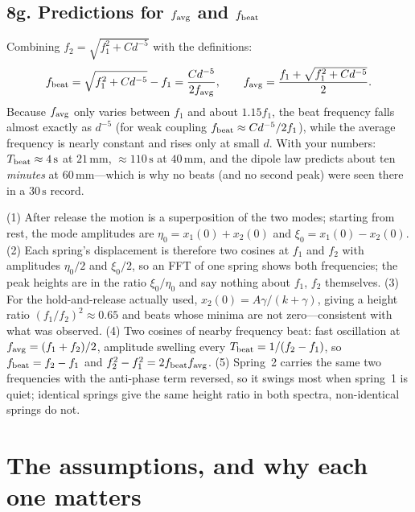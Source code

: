 \documentclass[11pt,a4paper]{article}
\newcommand{\un}[1]{\,\mathrm{#1}}
\begin{document}
\subsection*{8g. Predictions for $f_{\rm avg}$ and $f_{\rm beat}$}
Combining $f_2=\sqrt{f_1^2+Cd^{-5}}$ with the definitions:
\begin{equation}
f_{\rm beat}=\sqrt{f_1^2+Cd^{-5}}-f_1=\frac{Cd^{-5}}{2f_{\rm avg}},\qquad
f_{\rm avg}=\frac{f_1+\sqrt{f_1^2+Cd^{-5}}}{2}.
\end{equation}
Because $f_{\rm avg}$ only varies between $f_1$ and about $1.15f_1$, the beat frequency falls almost exactly as $d^{-5}$ (for weak coupling $f_{\rm beat}\approx Cd^{-5}/2f_1$), while the average frequency is nearly constant and rises only at small $d$. With your numbers: $T_{\rm beat}\approx4\un{s}$ at $21\un{mm}$, $\approx110\un{s}$ at $40\un{mm}$, and the dipole law predicts about ten \emph{minutes} at $60\un{mm}$---which is why no beats (and no second peak) were seen there in a $30\un{s}$ record.

\begin{ownwords}
(1) After release the motion is a superposition of the two modes; starting from rest, the mode amplitudes are $\eta_0=x_1(0)+x_2(0)$ and $\xi_0=x_1(0)-x_2(0)$. (2) Each spring's displacement is therefore two cosines at $f_1$ and $f_2$ with amplitudes $\eta_0/2$ and $\xi_0/2$, so an FFT of one spring shows both frequencies; the peak heights are in the ratio $\xi_0/\eta_0$ and say nothing about $f_1$, $f_2$ themselves. (3) For the hold-and-release actually used, $x_2(0)=A\gamma/(k+\gamma)$, giving a height ratio $(f_1/f_2)^2\approx0.65$ and beats whose minima are not zero---consistent with what was observed. (4) Two cosines of nearby frequency beat: fast oscillation at $f_{\rm avg}=(f_1+f_2)/2$, amplitude swelling every $T_{\rm beat}=1/(f_2-f_1)$, so $f_{\rm beat}=f_2-f_1$ and $f_2^2-f_1^2=2f_{\rm beat}f_{\rm avg}$. (5) Spring~2 carries the same two frequencies with the anti-phase term reversed, so it swings most when spring~1 is quiet; identical springs give the same height ratio in both spectra, non-identical springs do not.
\end{ownwords}

\bigskip

\section{The assumptions, and why each one matters}
\end{document}
